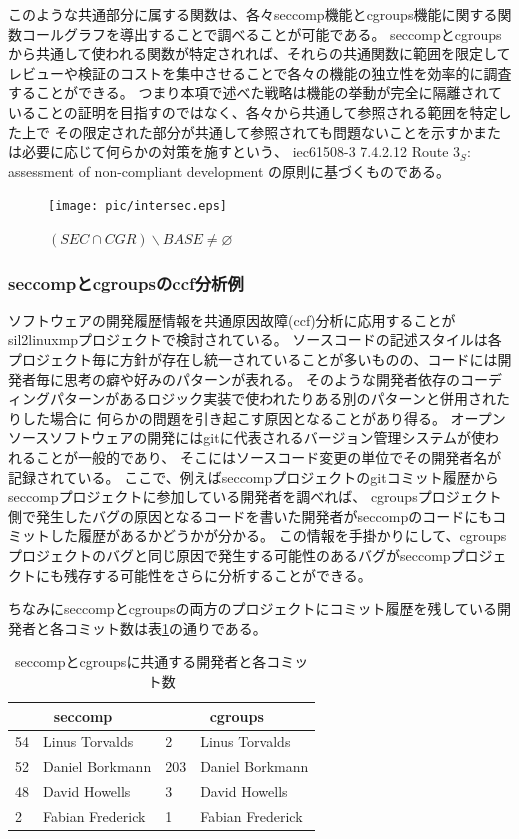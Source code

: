 このような共通部分に属する関数は、各々\acrshort{seccomp}機能と\acrshort{cgroups}機能に関する関数コールグラフを導出することで調べることが可能である。
\acrshort{seccomp}と\acrshort{cgroups}から共通して使われる関数が特定されれば、それらの共通関数に範囲を限定してレビューや検証のコストを集中させることで各々の機能の独立性を効率的に調査することができる。
つまり本項で述べた戦略は機能の挙動が完全に隔離されていることの証明を目指すのではなく、各々から共通して参照される範囲を特定した上で
その限定された部分が共通して参照されても問題ないことを示すかまたは必要に応じて何らかの対策を施すという、
\acrshort{iec61508}-3 7.4.2.12 Route $3_S$: assessment of non-compliant development の原則に基づくものである。
\begin{figure}[ht]
  \centering
  \texttt{[image: pic/intersec.eps]}\
  \caption{$(SEC \cap CGR) \smallsetminus BASE \neq \varnothing$}
  \label{intersec}
\end{figure}
\subsubsection{\acrshort{seccomp}と\acrshort{cgroups}の\gls{ccf}分析例}
ソフトウェアの開発履歴情報を共通原因故障(\gls{ccf})分析に応用することが\acrshort{sil2linuxmp}プロジェクトで検討されている。
ソースコードの記述スタイルは各プロジェクト毎に方針が存在し統一されていることが多いものの、コードには開発者毎に思考の癖や好みのパターンが表れる。
そのような開発者依存のコーディングパターンがあるロジック実装で使われたりある別のパターンと併用されたりした場合に
何らかの問題を引き起こす原因となることがあり得る。
オープンソースソフトウェアの開発には\acrshort{git}に代表されるバージョン管理システムが使われることが一般的であり、
そこにはソースコード変更の単位でその開発者名が記録されている。
ここで、例えば\acrshort{seccomp}プロジェクトの\acrshort{git}コミット履歴から\acrshort{seccomp}プロジェクトに参加している開発者を調べれば、
\acrshort{cgroups}プロジェクト側で発生したバグの原因となるコードを書いた開発者が\acrshort{seccomp}のコードにもコミットした履歴があるかどうかが分かる。
この情報を手掛かりにして、\acrshort{cgroups}プロジェクトのバグと同じ原因で発生する可能性のあるバグが\acrshort{seccomp}プロジェクトにも残存する可能性をさらに分析することができる。
\par
ちなみに\acrshort{seccomp}と\acrshort{cgroups}の両方のプロジェクトにコミット履歴を残している開発者と各コミット数は表\ref{deveopers}の通りである。
\begin{table}[hb]
  \caption{\acrshort{seccomp}と\acrshort{cgroups}に共通する開発者と各コミット数}
  \label{deveopers}
  \centering
  \begin{tabular}{ll|ll}
    \multicolumn{2}{c|}{\acrshort{seccomp}} & \multicolumn{2}{c}{\acrshort{cgroups}} \\
    \hline 
    54 & Linus Torvalds & 2 & Linus Torvalds \\
    52 & Daniel Borkmann & 203 & Daniel Borkmann \\
    48 & David Howells & 3 & David Howells \\
    2 & Fabian Frederick & 1 & Fabian Frederick
  \end{tabular}
\end{table}
